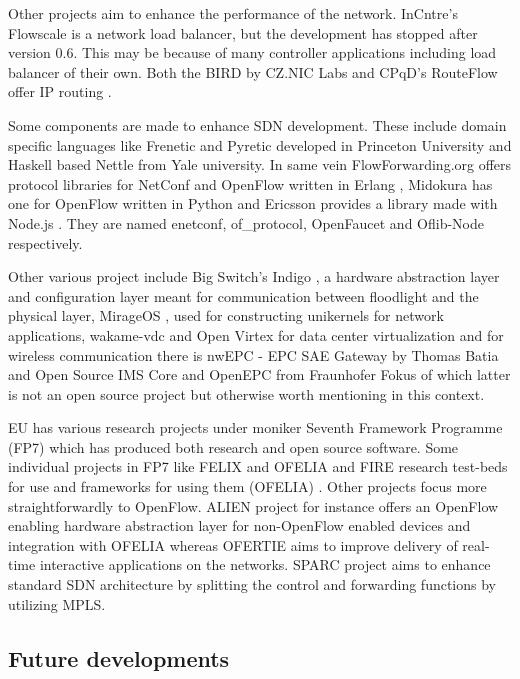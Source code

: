 Other projects aim to enhance the performance of the network. InCntre’s Flowscale \cite{Flowscale} is a network load balancer, but the development has stopped after version 0.6. This may be because of many controller applications including load balancer of their own. Both the BIRD by CZ.NIC Labs and CPqD’s RouteFlow offer IP routing \cite{Bird, RouteFlow}.

Some components are made to enhance SDN development. These include domain specific languages like Frenetic and Pyretic developed in Princeton University \cite{Frenetic} and Haskell based Nettle \cite{Nettle} from Yale university. In same vein FlowForwarding.org offers protocol libraries for NetConf and OpenFlow written in Erlang \cite{enetconf,ofproto}, Midokura has one for OpenFlow written in Python \cite{OpenFaucet} and Ericsson provides a library made with Node.js \cite{Node}. They are named enetconf, of\_protocol, OpenFaucet and Oflib-Node respectively. 

Other various project include Big Switch’s Indigo \cite{Indigo}, a hardware abstraction layer and configuration layer meant for communication between floodlight and the physical layer, MirageOS \cite{Mirage}, used for constructing unikernels for network applications, wakame-vdc and Open Virtex for data center virtualization \cite{wakame, Virtex} and for wireless communication there is nwEPC - EPC SAE Gateway by Thomas Batia \cite{nwEPC} and Open Source IMS Core and OpenEPC from Fraunhofer Fokus \cite{IMSCORE, OpenEPC} of which latter is not an open source project but otherwise worth mentioning in this context. 

EU has various research projects under moniker Seventh Framework Programme (FP7) \cite{FP7} which has produced both research and open source software. Some individual projects in FP7 like FELIX and OFELIA and FIRE research test-beds for use and frameworks for using them (OFELIA) \cite{FELIX, OFELIA, FIRE}. Other projects focus more straightforwardly to OpenFlow. ALIEN project \cite{ALIEN} for instance offers an OpenFlow enabling hardware abstraction layer for non-OpenFlow enabled devices and integration with OFELIA whereas OFERTIE \cite{OFERTIE} aims to improve delivery of real-time interactive applications on the networks. SPARC \cite{SPARC} project aims to enhance standard SDN architecture by splitting the control and forwarding functions by utilizing MPLS.

\subsection{Future developments}

